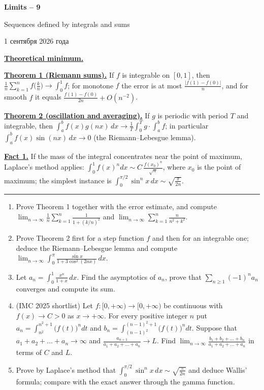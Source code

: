 \documentclass[11pt,a4paper]{article}
\renewcommand{\ge}{\geqslant}
\newcommand{\head}[1]{\par\bigskip\noindent\textbf{\underline{#1}}\quad}
\begin{document}
\begin{center}
{\huge\bfseries Limits -- 9\par}\vspace{1.2em}
{\Large Sequences defined by integrals and sums\par}\vspace{0.8em}
{\foreignlanguage{russian}{1 сентября 2026 года}\par}
\end{center}

\noindent\textbf{\underline{Theoretical minimum.}}\par\vspace{-\bigskipamount}\medskip

\head{Theorem 1 (Riemann sums).} If $f$ is integrable on $[0,1]$, then
$\frac1n\sum_{k=1}^nf\bigl(\frac kn\bigr)\to\int_0^1f$; for monotone $f$ the error is at most
$\frac{|f(1)-f(0)|}{n}$, and for smooth $f$ it equals $\frac{f(1)-f(0)}{2n}+O(n^{-2})$.

\head{Theorem 2 (oscillation and averaging).} If $g$ is periodic with period $T$ and integrable,
then $\int_a^bf(x)g(nx)\,dx\to\frac1T\int_0^Tg\cdot\int_a^bf$; in particular
$\int_a^bf(x)\sin(nx)\,dx\to0$ (the Riemann--Lebesgue lemma).

\head{Fact 1.} If the mass of the integral concentrates near the point of maximum, Laplace's method
applies: $\int_0^1f(x)^ndx\sim C\,\frac{f(x_0)^n}{\sqrt n}$, where $x_0$ is the point of maximum;
the simplest instance is $\int_0^{\pi/2}\sin^nx\,dx\sim\sqrt{\frac\pi{2n}}$.

\noindent\rule{\textwidth}{0.4pt}\par\medskip

\begin{enumerate}[itemsep=0.6em]
\item Prove Theorem 1 together with the error estimate, and compute
$\lim_{n\to\infty}\frac1n\sum_{k=1}^n\frac1{1+(k/n)^2}$ and $\lim_{n\to\infty}\sum_{k=1}^n\frac n{n^2+k^2}$.

\item Prove Theorem 2 first for a step function $f$ and then for an integrable one; deduce the
Riemann--Lebesgue lemma and compute $\lim_{n\to\infty}\int_0^\pi\frac{\sin x}{1+3\cos^2(2nx)}\,dx$.

\item Let $a_n=\int_0^1\frac{x^n}{1+x}\,dx$. Find the asymptotics of $a_n$, prove that
$\sum_{n\ge1}(-1)^na_n$ converges and compute its sum.

\item (IMC 2025 shortlist) Let $f\colon[0,+\infty)\to[0,+\infty)$ be continuous with $f(x)\to C>0$
as $x\to+\infty$. For every positive integer $n$ put $a_n=\int_{n^2}^{n^2+1}\bigl(f(t)\bigr)^ndt$ and
$b_n=\int_{(n-1)^2}^{(n-1)^2+1}\bigl(f(t)\bigr)^ndt$. Suppose that $a_1+a_2+\dots+a_n\to\infty$ and
$\frac{a_{n+1}}{a_1+a_2+\dots+a_n}\to L$. Find
$\lim_{n\to\infty}\frac{b_1+b_2+\dots+b_n}{a_1+a_2+\dots+a_n}$ in terms of $C$ and $L$.

\item Prove by Laplace's method that $\int_0^{\pi/2}\sin^nx\,dx\sim\sqrt{\frac\pi{2n}}$ and deduce
Wallis' formula; compare with the exact answer through the gamma function.
\end{enumerate}
\end{document}
